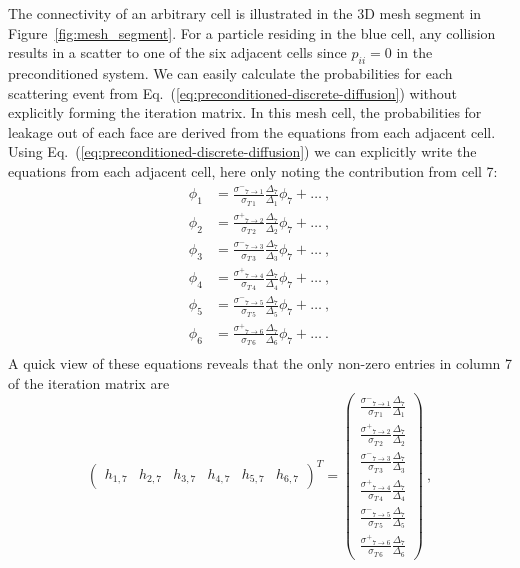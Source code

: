 \documentclass[preprint,12pt]{elsarticle}
\newcommand{\sigm}{\ensuremath{\sigma^{-}}}
\newcommand{\sigp}{\ensuremath{\sigma^{+}}}
\begin{document}
The connectivity of an arbitrary cell is illustrated in the 3D mesh segment in
Figure~\ref{fig:mesh_segment}.  For a particle residing in the blue cell, any
collision results in a scatter to one of the six adjacent cells since
$p_{ii}=0$ in the preconditioned system.  We can easily calculate the
probabilities for each scattering event from
Eq.~(\ref{eq:preconditioned-discrete-diffusion}) without explicitly forming
the iteration matrix.  In this mesh cell, the probabilities for leakage out of
each face are derived from the equations from each adjacent cell.  Using
Eq.~(\ref{eq:preconditioned-discrete-diffusion}) we can explicitly write the
equations from each adjacent cell, here only noting the contribution from cell
7:
\begin{align*}
  \phi_1 &= \frac{\sigm_{7\rightarrow 1}}{\sigma_{T\,1}}
  \frac{\Delta_7}{\Delta_1}\phi_7 + \ldots\:,\\
  \phi_2 &= \frac{\sigp_{7\rightarrow 2}}
  {\sigma_{T\,2}}\frac{\Delta_7}{\Delta_2}\phi_7 + \ldots\:,\\
  \phi_3 &= \frac{\sigm_{7\rightarrow 3}}{\sigma_{T\,3}}
  \frac{\Delta_7}{\Delta_3}\phi_7 + \ldots\:,\\
  \phi_4 &= \frac{\sigp_{7\rightarrow 4}}{\sigma_{T\,4}}
  \frac{\Delta_7}{\Delta_4}\phi_7 + \ldots\:,\\
  \phi_5 &= \frac{\sigm_{7\rightarrow 5}}{\sigma_{T\,5}}
  \frac{\Delta_7}{\Delta_5}\phi_7 + \ldots\:,\\
  \phi_6 &= \frac{\sigp_{7\rightarrow 6}}{\sigma_{T\,6}}
  \frac{\Delta_7}{\Delta_6}\phi_7 + \ldots\:.\\
\end{align*}
A quick view of these equations reveals that the only non-zero entries in
column 7 of the iteration matrix are
\begin{equation*}
  \begin{pmatrix}
    h_{1,7} & h_{2,7} & h_{3,7} & h_{4,7} & h_{5,7} & h_{6,7}
  \end{pmatrix}^{T}
  =
  \begin{pmatrix}
    \frac{\sigm_{7\rightarrow
        1}}{\sigma_{T\,1}}\frac{\Delta_7}{\Delta_1}
    \\ \frac{\sigp_{7\rightarrow
        2}}{\sigma_{T\,2}}\frac{\Delta_7}{\Delta_2}
    \\ \frac{\sigm_{7\rightarrow
        3}}{\sigma_{T\,3}}\frac{\Delta_7}{\Delta_3}
    \\ \frac{\sigp_{7\rightarrow
        4}}{\sigma_{T\,4}}\frac{\Delta_7}{\Delta_4}
    \\ \frac{\sigm_{7\rightarrow
        5}}{\sigma_{T\,5}}\frac{\Delta_7}{\Delta_5}
    \\ \frac{\sigp_{7\rightarrow
        6}}{\sigma_{T\,6}}\frac{\Delta_7}{\Delta_6}
  \end{pmatrix}\:,
\end{equation*}
\end{document}
